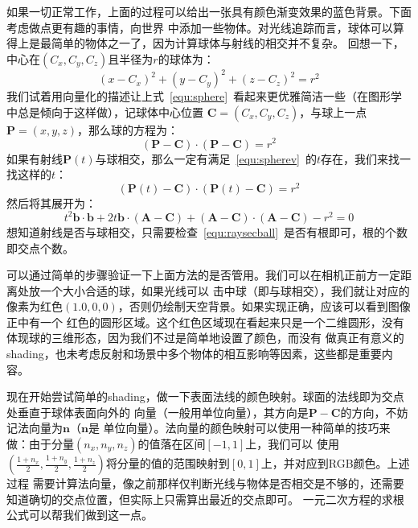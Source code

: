\documentclass[12pt]{article}
\begin{document}
\indent{}如果一切正常工作，上面的过程可以给出一张具有颜色渐变效果的蓝色背景。下面考虑做点更有趣的事情，向世界
中添加一些物体。对光线追踪而言，球体可以算得上是最简单的物体之一了，因为计算球体与射线的相交并不复杂。
回想一下，中心在$(C_x, C_y, C_z)$且半径为$r$的球体为：
\begin{equation}
\label{equ:sphere}
(x - C_x)^2 + (y - C_y)^2 + (z - C_z)^2 = r^2
\end{equation}
我们试着用向量化的描述让上式~\ref{equ:sphere}~看起来更优雅简洁一些（在图形学中总是倾向于这样做），记球体中心位置
$\mathbf{C} = (C_x, C_y, C_z)$，与球上一点$\mathbf{P} = (x,y,z)$，那么球的方程为：
\begin{equation}
\label{equ:spherev}
(\mathbf{P} - \mathbf{C}) \cdot (\mathbf{P} - \mathbf{C}) = r^2
\end{equation}
如果有射线$\mathbf{P}(t)$与球相交，那么一定有满足~\ref{equ:spherev}~的$t$存在，我们来找一找这样的$t$：
\begin{displaymath}
(\mathbf{P}(t) - \mathbf{C}) \cdot (\mathbf{P}(t) - \mathbf{C}) = r^2
\end{displaymath}
然后将其展开为：
\begin{equation}
\label{equ:raysecball}
t^2 \mathbf{b} \cdot \mathbf{b}
    + 2t \mathbf{b} \cdot (\mathbf{A}-\mathbf{C})
    + (\mathbf{A}-\mathbf{C}) \cdot (\mathbf{A}-\mathbf{C}) - r^2 = 0
\end{equation}
\noindent{}想知道射线是否与球相交，只需要检查~\ref{equ:raysecball}~是否有根即可，根的个数即交点个数。

\indent{}可以通过简单的步骤验证一下上面方法的是否管用。我们可以在相机正前方一定距离处放一个大小合适的球，如果光线可以
击中球（即与球相交），我们就让对应的像素为红色$(1.0,0,0)$，否则仍绘制天空背景。如果实现正确，应该可以看到图像正中有一个
红色的圆形区域。这个红色区域现在看起来只是一个二维圆形，没有体现球的三维形态，因为我们不过是简单地设置了颜色，而没有
做真正有意义的shading，也未考虑反射和场景中多个物体的相互影响等因素，这些都是重要内容。

\indent{}现在开始尝试简单的shading，做一下表面法线的颜色映射。球面的法线即为交点处垂直于球体表面向外的
向量（一般用单位向量），其方向是$\mathbf{P}-\mathbf{C}$的方向，不妨记法向量为$\mathbf{n}$（$\mathbf{n}$是
单位向量）。法向量的颜色映射可以使用一种简单的技巧来做：由于分量$(n_x, n_y, n_z)$的值落在区间$[-1,1]$上，我们可以
使用$(\frac{1+n_x}{2},\frac{1+n_y}{2},\frac{1+n_z}{2})$将分量的值的范围映射到$[0,1]$上，并对应到RGB颜色。上述过程
需要计算法向量，像之前那样仅判断光线与物体是否相交是不够的，还需要知道确切的交点位置，但实际上只需算出最近的交点即可。
一元二次方程的求根公式可以帮我们做到这一点。
\end{document}
